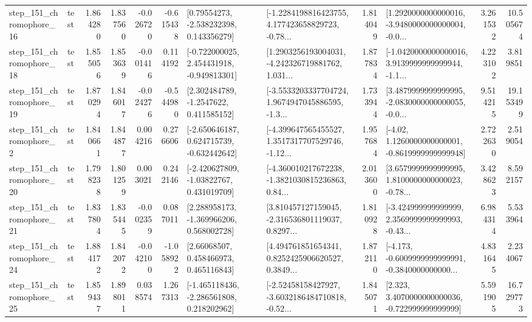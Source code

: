 \begin{tabular}{llrrrrllrlrr}
  step\_151\_chromophore\_16 &      test &      1.864280 &    1.837560 &     -0.026720 & -0.615438 &     [0.79554273, -2.538232398, 0.143356279] &  [-1.2284198816423755, 4.177423658829723, -0.78... &       1.814049 &  [1.2920000000000016, -3.9480000000000004, -0.0... &            3.261532 &         10.505674 \\
  step\_151\_chromophore\_18 &      test &      1.855056 &    1.853639 &     -0.001416 &  0.114192 &   [-0.722000025, 2.454431918, -0.949813301] &  [1.2903256193004031, -4.242326719881762, 1.031... &       1.877834 &  [-1.0420000000000016, 3.9139999999999944, -1.1... &            4.223102 &          3.819851 \\
  step\_151\_chromophore\_19 &      test &      1.870294 &    1.846017 &     -0.024276 & -0.544980 &      [2.302484789, -1.2547622, 0.411585152] &  [-3.5533203337704724, 1.9674947045886595, -1.3... &       1.733944 &  [3.4879999999999995, -2.0830000000000055, -0.0... &            9.514215 &         19.153499 \\
   step\_151\_chromophore\_2 &      test &      1.840661 &    1.844877 &      0.004216 &  0.276606 &   [-2.650646187, 0.624715739, -0.632442642] &  [-4.399647565455527, 1.3517317707529746, -1.12... &       1.957684 &   [-4.02, 1.1260000000000001, -0.8619999999999948] &            2.722630 &          2.519054 \\
  step\_151\_chromophore\_20 &      test &      1.798238 &    1.801259 &      0.003021 &  0.242146 &    [-2.420627809, -1.03822767, 0.431019709] &  [-4.360010217672238, -1.3821030815236863, 0.84... &       2.013600 &  [3.6579999999999995, 1.8100000000000023, -0.78... &            3.428623 &          8.592157 \\
  step\_151\_chromophore\_21 &      test &      1.837804 &    1.835445 &     -0.002359 &  0.087011 &    [2.288958173, -1.369966206, 0.568002728] &  [3.810457127159045, -2.316536801119037, 0.8297... &       1.810928 &  [-3.424999999999999, 2.3569999999999993, -0.43... &            6.984314 &          5.533964 \\
  step\_151\_chromophore\_24 &      test &      1.884172 &    1.842072 &     -0.042100 & -1.058922 &      [2.66068507, 0.458466973, 0.465116843] &  [4.494761851654341, 0.8252425906620527, 0.3849... &       1.872110 &  [-4.173, -0.6009999999999991, -0.3840000000000... &            4.831645 &          2.234067 \\
  step\_151\_chromophore\_25 &      test &      1.859437 &    1.898011 &      0.038574 &  1.267313 &   [-1.465118436, -2.286561808, 0.218202962] &  [-2.52458158427927, -3.6032186484710818, -0.52... &       1.845071 &    [2.323, 3.4070000000000036, -0.722999999999999] &            5.591905 &         16.729773 \\

\end{tabular}
